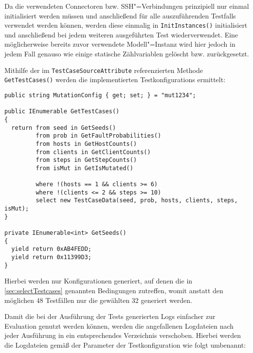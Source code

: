 Da die verwendeten Connectoren bzw. SSH"=Verbindungen prinzipiell nur einmal initialisiert werden müssen und anschließend für alle auszuführenden \glspl{Testfall} verwendet werden können, werden diese einmalig in \texttt{InitInstances()} initialisiert und anschließend bei jedem weiteren ausgeführten \gls{Test} wiederverwendet.
Eine möglicherweise bereits zuvor verwendete Modell"=Instanz wird hier jedoch in jedem Fall genauso wie einige statische Zählvariablen gelöscht bzw. zurückgesetzt.

Mithilfe der im \texttt{TestCaseSourceAttribute} referenzierten Methode \texttt{GetTestCases()} werden die implementierten \glspl{Testkonfiguration} ermittelt:

\begin{lstlisting}[label=lstgetTestCases:,style=cs,
caption={[Implementierung der Testkonfigurationen]
    Implementierung der \glspl{Testfall} (gekürzt).
    Die hier nicht gezeigten Methoden zur Rückgabe der implementierten Werte wie \texttt{GetFaultProbabilities()} sind nach dem gleichen Schema aufgebaut wie \texttt{GetSeeds()}.
    Mithilfe der Eigenschaft \texttt{MutationConfig} erfolgt die Auswahl des zu verwendeten Mutationsszenarios.}]
public string MutationConfig { get; set; } = "mut1234";

public IEnumerable GetTestCases()
{
  return from seed in GetSeeds()
         from prob in GetFaultProbabilities()
         from hosts in GetHostCounts()
         from clients in GetClientCounts()
         from steps in GetStepCounts()
         from isMut in GetIsMutated()
         
         where !(hosts == 1 && clients >= 6)
         where !(clients <= 2 && steps >= 10)
         select new TestCaseData(seed, prob, hosts, clients, steps, isMut);
}

private IEnumerable<int> GetSeeds()
{
  yield return 0xAB4FEDD;
  yield return 0x11399D3;
}
\end{lstlisting}

Hierbei werden nur Konfigurationen generiert, auf denen die in \cref{sec:selectTestcases} genannten Bedingungen zutreffen, womit anstatt den möglichen 48 Testfällen nur die gewählten 32 generiert werden.

Damit die bei der Ausführung der \glspl{Test} generierten Logs einfacher zur Evaluation genutzt werden können, werden die angefallenen Logdateien nach jeder Ausführung in ein entsprechendes Verzeichnis verschoben.
Hierbei werden die Logdateien gemäß der Parameter der \gls{Testkonfiguration} wie folgt umbenannt:

